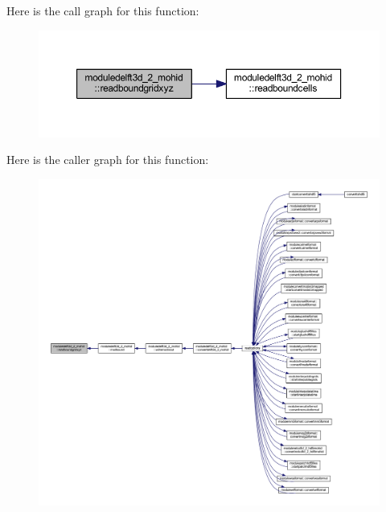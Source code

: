 Here is the call graph for this function\+:\nopagebreak
\begin{figure}[H]
\begin{center}
\leavevmode
\includegraphics[width=350pt]{namespacemoduledelft3d__2__mohid_a07dc591a7f52b875d18aee392df1d13d_cgraph}
\end{center}
\end{figure}
Here is the caller graph for this function\+:\nopagebreak
\begin{figure}[H]
\begin{center}
\leavevmode
\includegraphics[width=350pt]{namespacemoduledelft3d__2__mohid_a07dc591a7f52b875d18aee392df1d13d_icgraph}
\end{center}
\end{figure}
\mbox{\label{namespacemoduledelft3d__2__mohid_aa82a4835cdddf9eddf65ba75c51cff92}} 
